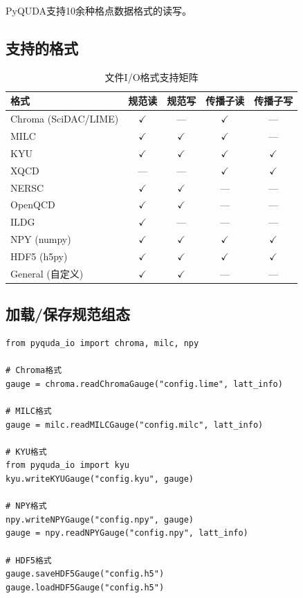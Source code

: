 \documentclass[12pt,a4paper]{ctexart}
\begin{document}
PyQUDA支持10余种格点数据格式的读写。

\subsection{支持的格式}

\begin{table}[H]
\centering
\caption{文件I/O格式支持矩阵}
\label{tab:io_formats}
\begin{tabular}{@{}lcccc@{}}
\toprule
\textbf{格式} & \textbf{规范读} & \textbf{规范写} & \textbf{传播子读} & \textbf{传播子写} \\
\midrule
Chroma (SciDAC/LIME) & $\checkmark$ & — & $\checkmark$ & — \\
MILC & $\checkmark$ & $\checkmark$ & $\checkmark$ & — \\
KYU & $\checkmark$ & $\checkmark$ & $\checkmark$ & $\checkmark$ \\
XQCD & — & — & $\checkmark$ & $\checkmark$ \\
NERSC & $\checkmark$ & $\checkmark$ & — & — \\
OpenQCD & $\checkmark$ & $\checkmark$ & — & — \\
ILDG & $\checkmark$ & — & — & — \\
NPY (numpy) & $\checkmark$ & $\checkmark$ & $\checkmark$ & $\checkmark$ \\
HDF5 (h5py) & $\checkmark$ & $\checkmark$ & $\checkmark$ & $\checkmark$ \\
General (自定义) & $\checkmark$ & $\checkmark$ & — & — \\
\bottomrule
\end{tabular}
\end{table}

\subsection{加载/保存规范组态}

\begin{lstlisting}[caption={规范组态I/O}]
from pyquda_io import chroma, milc, npy

# Chroma格式
gauge = chroma.readChromaGauge("config.lime", latt_info)

# MILC格式
gauge = milc.readMILCGauge("config.milc", latt_info)

# KYU格式
from pyquda_io import kyu
kyu.writeKYUGauge("config.kyu", gauge)

# NPY格式
npy.writeNPYGauge("config.npy", gauge)
gauge = npy.readNPYGauge("config.npy", latt_info)

# HDF5格式
gauge.saveHDF5Gauge("config.h5")
gauge.loadHDF5Gauge("config.h5")
\end{lstlisting}
\end{document}
